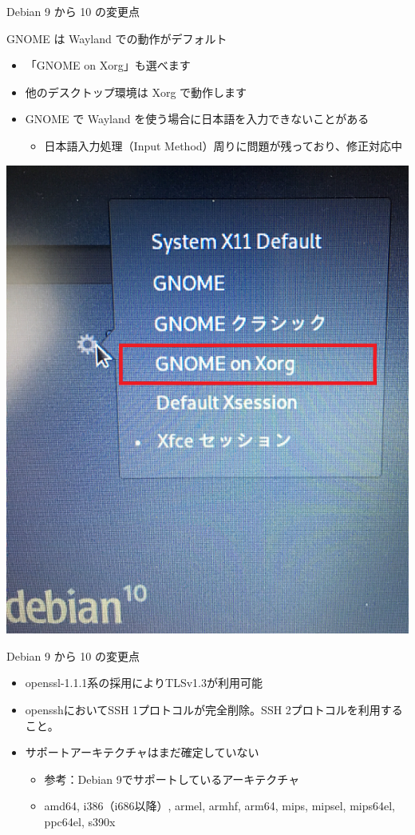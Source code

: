 \begin{frame}{Debian 9 から 10 の変更点}%

GNOME は Wayland での動作がデフォルト

\begin{itemize}
\item 「GNOME on Xorg」も選べます
\item 他のデスクトップ環境は Xorg で動作します
\item GNOME で Wayland を使う場合に日本語を入力できないことがある
  \begin{itemize}
  \item 日本語入力処理（Input Method）周りに問題が残っており、修正対応中
  \end{itemize}
\end{itemize}

\begin{center}
  \includegraphics[width=0.5\hsize]{image201902/GDM_GNOME_select_mark.png}
\end{center}

\end{frame}


\begin{frame}{Debian 9 から 10 の変更点}%

  \begin{itemize}
  \item openssl-1.1.1系の採用によりTLSv1.3が利用可能
  \item opensshにおいてSSH 1プロトコルが完全削除。SSH 2プロトコルを利用すること。
  \item サポートアーキテクチャはまだ確定していない
    \begin{itemize}
    \item 参考：Debian 9でサポートしているアーキテクチャ
    \item amd64, i386（i686以降）, armel, armhf, arm64, mips, mipsel, mips64el, ppc64el, s390x
    \end{itemize}
  \end{itemize}

\end{frame}


